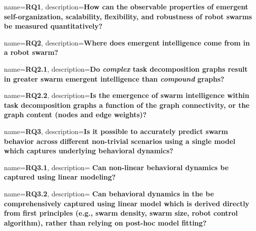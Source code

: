 {
  name={\textbf{RQ1}},
  description={\textbf{How can the observable properties of emergent
      self-organization, scalability, flexibility, and robustness of robot
      swarms be measured quantitatively?}}
}

{
  name={\textbf{RQ2}},
  description={\textbf{Where does emergent intelligence come from in a robot swarm?}}
}

{
  name={\textbf{RQ2.1}},
  description={\textbf{Do \emph{complex} task decomposition graphs result in
      greater swarm emergent intelligence than \emph{compound} graphs?}}
}

{
  name={\textbf{RQ2.2}},
  description={\textbf{Is the emergence of swarm intelligence within task
        decomposition graphs a function of the graph connectivity, or
        the graph content (nodes and edge weights)?}}
}

{
  name={\textbf{RQ3}},
  description={\textbf{Is it possible to accurately predict swarm behavior across
      different non-trivial scenarios using a single model which captures
      underlying behavioral dynamics?}}
}

{
  name={\textbf{RQ3.1}},
  description={ \textbf{Can non-linear behavioral dynamics be captured using
      linear modeling?}  } }

 {
  name={\textbf{RQ3.2}},
  description={
    \noindent\textbf{Can behavioral dynamics in the be
  comprehensively captured using linear model which is derived directly from
  first principles (e.g., swarm density, swarm size, robot control algorithm),
  rather than relying on post-hoc model fitting?}
} }
